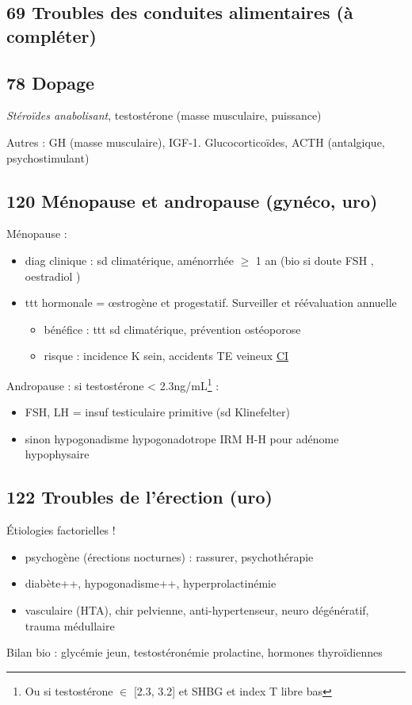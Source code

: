 \documentclass[11pt]{article}
\begin{document}
\subsection{69 Troubles des conduites alimentaires (à compléter)}
\label{sec:org51476c1}
\subsection{78 Dopage}
\label{sec:org502f03c}
\emph{Stéroïdes anabolisant}, testostérone (\inc masse musculaire, puissance)

Autres : GH (\inc masse musculaire), IGF-1. Glucocorticoïdes, ACTH (antalgique, psychostimulant)
\subsection{120 Ménopause et andropause (gynéco, uro)}
\label{sec:org404fdaf}
Ménopause :
\begin{itemize}
\item diag clinique : sd climatérique, aménorrhée \(\ge\) 1 an (bio si doute FSH \inc, oestradiol \inc)
\item ttt hormonale = \oe{}strogène et progestatif. Surveiller et réévaluation annuelle
\begin{itemize}
\item bénéfice : ttt sd climatérique, prévention ostéoporose
\item risque : \inc incidence K sein, \inc accidents TE veineux \thus \uline{CI}
\end{itemize}
\end{itemize}
Andropause : si testostérone < 2.3ng/mL\footnote{Ou si testostérone \(\in\) [2.3, 3.2] et SHBG et index T libre bas} :
\begin{itemize}
\item FSH, LH \inc = insuf testiculaire primitive (sd Klinefelter)
\item sinon hypogonadisme hypogonadotrope \thus IRM H-H pour adénome hypophysaire
\end{itemize}

\subsection{122 Troubles de l'érection  (uro)}
\label{sec:org2d554ed}
Étiologies factorielles !
\begin{itemize}
\item psychogène (érections nocturnes) : rassurer, psychothérapie
\item diabète++, hypogonadisme++, hyperprolactinémie
\item vasculaire (HTA), chir pelvienne, anti-hypertenseur, neuro dégénératif, trauma médullaire
\end{itemize}
Bilan bio : glycémie jeun, testostéronémie \textpm{} prolactine, hormones thyroïdiennes
\end{document}
